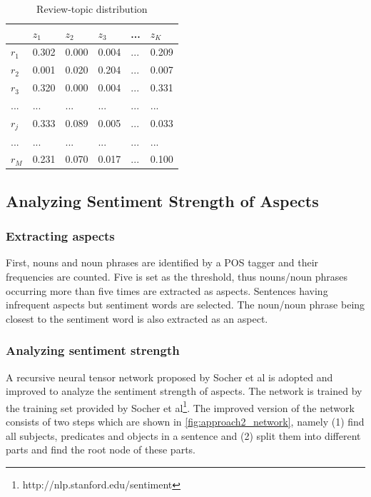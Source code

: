 \begin{table} [t]
    \centering
    \begin{small}
    \caption{Review-topic distribution \cite[Table II]{Qian2016}}
    \label{tab:review_topic_distribution}
    \setlength{\tabcolsep}{1em}
    \begin{tabular}{l|l l l l l}
     & $z_1$ & $z_2$ & $z_3$ & ... & $z_K$\\
     \hline
    $r_1$ & 0.302 & 0.000 & 0.004 & ... & 0.209\\
    $r_2$ & 0.001 & 0.020 & 0.204 & ... & 0.007\\
    $r_3$ & 0.320 & 0.000 & 0.004 & ... & 0.331\\
    ... & ... & ... & ... & ... & ...\\
    $r_j$& 0.333 & 0.089 & 0.005 & ... & 0.033\\
    ... & ... & ... & ... & ... & ...\\
    $r_M$ & 0.231 & 0.070 & 0.017 & ... & 0.100\\
    \end{tabular}
    \end{small}
\end{table}

\subsection*{Analyzing Sentiment Strength of Aspects}

\subsubsection*{Extracting aspects}
First, nouns and noun phrases are identified by a POS tagger and their frequencies are counted. Five is set as the threshold, thus nouns/noun phrases occurring more than five times are extracted as aspects. Sentences having infrequent aspects but sentiment words are selected. The noun/noun phrase being closest to the sentiment word is also extracted as an aspect.

\subsubsection*{Analyzing sentiment strength}
A recursive neural tensor network proposed by Socher et al \cite{Socher2013} is adopted and improved to analyze the sentiment strength of aspects. The network is trained by the training set provided by Socher et al\footnote{http://nlp.stanford.edu/sentiment}. The improved version of the network consists of two steps which are shown in \autoref{fig:approach2_network}, namely (1) find all subjects, predicates and objects in a sentence and (2) split them into different parts and find the root node of these parts.

